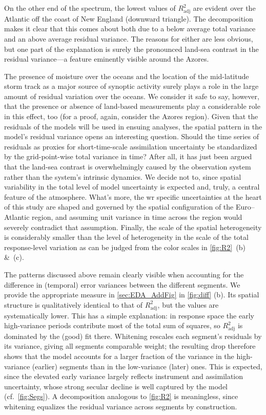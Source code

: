 On the other end of the spectrum, the lowest values of $R^2_{\mathrm{adj}}$ are evident over the Atlantic off the coast of New England (downward triangle). The decomposition makes it clear that this comes about both due to a below average total variance and an above average residual variance. The reasons for either are less obvious, but one part of the explanation is surely the pronounced land-sea contrast in the residual variance---a feature eminently visible around the Azores.

The presence of moisture over the oceans and the location of the mid-latitude storm track as a major source of synoptic activity surely plays a role in the large amount of residual variation over the oceans. We consider it safe to say, however, that the presence or absence of land-based measurements play a considerable role in this effect, too (for a proof, again, consider the Azores region). Given that the residuals of the models will be used in ensuing analyses, the spatial pattern in the model's residual variance opens an interesting question. Should the time series of residuals as proxies for short-time-scale assimilation uncertainty be standardized by the grid-point-wise total variance in time? After all, it has just been argued that the land-sea contrast is overwhelmingly caused by the observation system rather than the system's intrinsic dynamics. We decide not to, since spatial variability in the total level of model uncertainty is expected and, truly, a central feature of the atmosphere. What's more, the \gls{wr} specific uncertainties at the heart of this study are shaped and governed by the spatial configuration of the Euro--Atlantic region, and assuming unit variance in time across the region would severely contradict that assumption. Finally, the scale of the spatial heterogeneity is considerably smaller than the level of heterogeneity in the scale of the total response-level variation as can be judged from the color scales in \cref{fig:R2}~(b) \&~(c).

The patterns discussed above remain clearly visible when accounting for the difference in (temporal) error variances between the different segments. We provide the appropriate measure in \cref{sec:EDA_AddFig} in \cref{fig:diff} (b).
Its spatial structure is qualitatively identical
to that of $R^2_{\mathrm{adj}}$, but the values are systematically lower.
This has a simple explanation: in response space the early high-variance
periods contribute most of the total sum of squares, so $R^2_{\mathrm{adj}}$
is dominated by the (good) fit there. Whitening rescales each segment's
residuals by its variance, giving all segments comparable weight; the
resulting drop therefore shows that the model accounts for a larger
fraction of the variance in the high-variance (earlier) segments than in
the low-variance (later) ones. This is expected, since the elevated early
variance largely reflects instrument and assimilation uncertainty, whose
strong secular decline is well captured by the model (cf.~\cref{fig:Segs}).
A decomposition analogous to \cref{fig:R2} is meaningless, since whitening equalizes the residual variance across segments by
construction.

